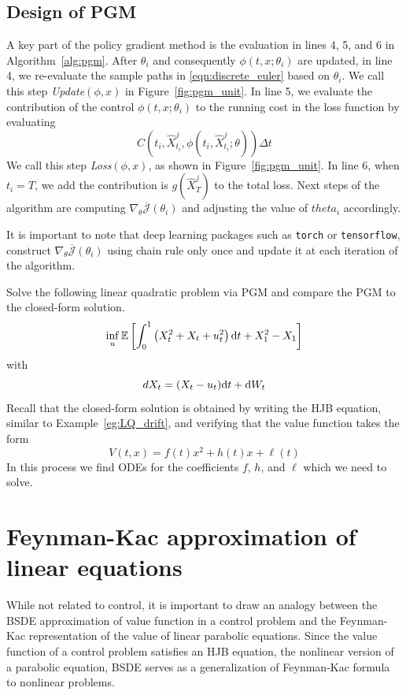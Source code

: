 \documentclass[11pt]{book}
\newcommand{\dt}{\text{\normalfont d}t}
\newcommand{\dW}{\text{\normalfont d}W}
\begin{document}
\subsection{Design of PGM}
A key part of the policy gradient method is the evaluation in lines 4, 5, and 6 in Algorithm~\ref{alg:pgm}. After $\theta_i$ and consequently $\phi(t,x;\theta_i)$ are updated, in line 4, we  re-evaluate the sample paths in \eqref{eqn:discrete_euler} based on $\theta_i$. 
We call this step \emph{Update$(\phi,x)$} in Figure~\ref{fig:pgm_unit}. In line 5, we evaluate the contribution of the control $\phi(t,x;\theta_i)$ to the running cost in the loss function by evaluating
\[
C(t_{i},\hat{X}^j_{t_i},\phi(t_{i},\hat{X}^j_{t_{i}};\theta))\Delta t
\]
We call this step \emph{Loss$(\phi,x)$}, as shown in Figure~\ref{fig:pgm_unit}. In line 6, when $t_i=T$, we add the contribution is $g(\hat{X}^j_T)$ to the total loss. Next steps of the algorithm are computing $\nabla_\theta \overline{\mathcal{J}}(\theta_{i})$ and adjusting the value of $theta_i$ accordingly. 

It is important to note that deep learning packages such as \verb|torch| or \verb|tensorflow|, construct $\nabla_\theta \overline{\mathcal{J}}(\theta_{i})$ using chain rule only once and update it at each iteration of the algorithm. 

\begin{ex}
    Solve the following linear quadratic problem via PGM and compare the PGM to the closed-form solution.
    \[
    \inf_u\mathbb{E}\left[\int_0^1\left(X_t^2+X_t+u_t^2\right)\dt + X_1^2 -X_1\right]
    \]
    with
    \[
    dX_t=(X_t-u_t)\dt+\dW_t
    \]
Recall that the closed-form solution is obtained by writing the HJB equation, similar to Example~\ref{eg:LQ_drift}, and verifying that the value function takes the form 
\[
V(t,x)=f(t)x^2+h(t)x+\ell(t)
\]
In this process we find ODEs for the coefficients $f$, $h$, and $\ell$ which we need to solve.
\end{ex}
\section{Feynman-Kac approximation of linear equations}
\label{sec:F-K_approx}
While not related to control, it is important to draw an analogy between the BSDE approximation of value function in a control problem and the Feynman-Kac representation of the value of linear parabolic equations. Since the value function of a control problem satisfies an HJB equation, the nonlinear version of a parabolic equation, BSDE serves as a generalization of Feynman-Kac formula to nonlinear problems.
\end{document}
